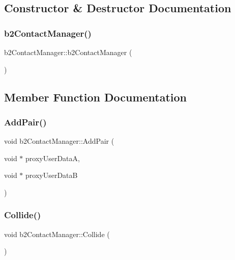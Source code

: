 \subsection{Constructor \& Destructor Documentation}
\mbox{\label{classb2_contact_manager_aec0a437c9d144fd976247a7acabb666d}} 
\subsubsection{\texorpdfstring{b2ContactManager()}{b2ContactManager()}}
{\footnotesize\ttfamily b2\+Contact\+Manager\+::b2\+Contact\+Manager (\begin{DoxyParamCaption}{ }\end{DoxyParamCaption})}



\subsection{Member Function Documentation}
\mbox{\label{classb2_contact_manager_ae67a458b64b02bea19955c19cb1fd6f4}} 
\subsubsection{\texorpdfstring{AddPair()}{AddPair()}}
{\footnotesize\ttfamily void b2\+Contact\+Manager\+::\+Add\+Pair (\begin{DoxyParamCaption}\item[{void $\ast$}]{proxy\+User\+DataA,  }\item[{void $\ast$}]{proxy\+User\+DataB }\end{DoxyParamCaption})}

\mbox{\label{classb2_contact_manager_a3380f85adf40f542a7ad6f2e63a76ac6}} 
\subsubsection{\texorpdfstring{Collide()}{Collide()}}
{\footnotesize\ttfamily void b2\+Contact\+Manager\+::\+Collide (\begin{DoxyParamCaption}{ }\end{DoxyParamCaption})}

